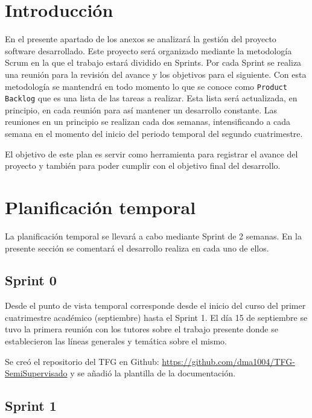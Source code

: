 
\section{Introducción}

En el presente apartado de los anexos se analizará la gestión del proyecto
software desarrollado. Este proyecto será organizado mediante la metodología
Scrum en la que el trabajo estará dividido en Sprints. Por cada Sprint se
realiza una reunión para la revisión del avance y los objetivos para el
siguiente.  Con esta metodología se mantendrá en todo momento lo que se conoce
como \texttt{Product Backlog} que es una lista de las tareas a realizar. Esta
lista será actualizada, en principio, en cada reunión para así mantener un
desarrollo constante. Las reuniones en un principio se realizan cada dos
semanas, intensificando a cada semana en el momento del inicio del periodo
temporal del segundo cuatrimestre.

El objetivo de este plan es servir como herramienta para registrar el avance del
proyecto y también para poder cumplir con el objetivo final del desarrollo.


\section{Planificación temporal}
La planificación temporal se llevará a cabo mediante Sprint de 2 semanas.
En la presente sección se comentará el desarrollo realiza en cada uno de ellos.

\subsection{Sprint 0}

Desde el punto de vista temporal corresponde desde el inicio del curso del
primer cuatrimestre académico (septiembre) hasta el Sprint 1. El día 15 de
septiembre se tuvo la primera reunión con los tutores sobre el trabajo presente
donde se establecieron las líneas generales y temática sobre el mismo.

Se creó el repositorio del TFG en Github: \url{https://github.com/dma1004/TFG-SemiSupervisado}
y se añadió la plantilla de la documentación.

\subsection{Sprint 1}

